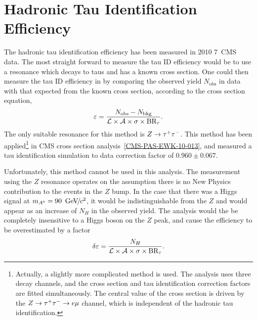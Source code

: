 \section{Hadronic Tau Identification Efficiency}
\label{sec:HadTauIdEff}
%
The hadronic tau identification efficiency has been measured in 2010 7~\TeV CMS
data.  The most straight forward to measure the tau ID efficiency would be to
use a resonance which decays to taus and has a known cross section.  One could
then measure the tau ID efficiency in by comparing the observed yield
$N_\text{obs}$ in data with that expected from the known cross section,
according to the cross section equation,
\begin{equation}
  \varepsilon = \frac{N_\text{obs} - N_\text{bkg}}
  {\mathcal{L} \times \mathcal{A} \times \mbox{\ensuremath{\sigma \times \text{BR}_\tau}}}.
  \nonumber
\end{equation}
The only suitable resonance for this method is $Z\to\tau^+\tau^-$.  This method has been
applied\footnote{Actually, a slightly more complicated method is used. The
analysis uses three decay channels, and the \ZTT cross section and tau
identification correction factors are fitted simultaneously. The central value
of the \ZTT cross section is driven by the $Z\to\tau^+\tau^- \to e \mu$ channel, which is
independent of the hadronic tau identification.} in CMS \ZTT cross section
analysis~\ref{CMS-PAS-EWK-10-013}, and measured a tau identification simulation
to data correction factor of \mbox{$0.960 \pm 0.067$}.

Unfortunately, this method cannot be used in this analysis.  The measurement
using the $Z$ resonance operates on the assumption there is no New Physics
contribution to the events in the $Z$ bump.  In the case that there was a Higgs
signal at $m_{A^0} = 90~{\,\text{Ge\hspace{-.08em}V\hspace{-0.16em}/\hspace{-0.08em}}c^\text{2}}$, it would be indistinguishable from the $Z$ and
would appear as an increase of $N_{H}$ in the observed yield.  The analysis
would the be completely insensitive to a Higgs boson on the $Z$ peak, and cause
the efficiency to be overestimated by a factor 
\begin{equation}
  \delta \varepsilon = \frac{N_H}
  {\mathcal{L} \times \mathcal{A} \times \mbox{\ensuremath{\sigma \times \text{BR}_\tau}}}.
  \nonumber
\end{equation}

